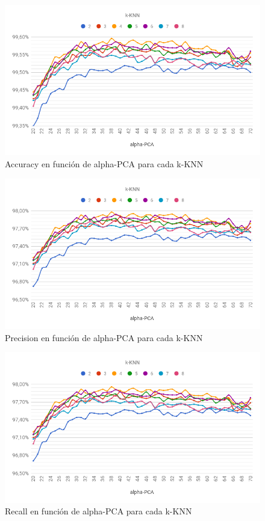 \begin{figure}[h]
    \centering
    \includegraphics[width=\textwidth]{graficos/cv2_accuracy.png}
    \caption{Accuracy en función de alpha-PCA para cada k-KNN}
    \label{fig:cv2_accuracy}
\end{figure}

\begin{figure}[h]
    \centering
    \includegraphics[width=\textwidth]{graficos/cv2_precision.png}
    \caption{Precision en función de alpha-PCA para cada k-KNN}
    \label{fig:cv2_precision}
\end{figure}

\begin{figure}[H]
    \centering
    \includegraphics[width=\textwidth]{graficos/cv2_recall.png}
    \caption{Recall en función de alpha-PCA para cada k-KNN}
    \label{fig:cv2_recall}
\end{figure}

